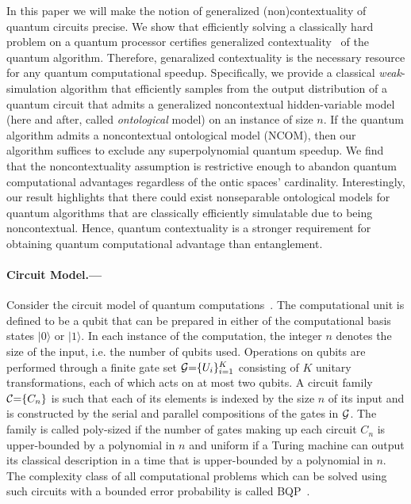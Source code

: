\documentclass[prl,twocolumn,amsmath,amssymb,nofootinbib]{revtex4-1}
\renewcommand{\ket}[1] {| #1 \rangle}
\newcommand{\CC}{{\cal C}}
\newcommand{\G}{{\cal G}}
\begin{document}
In this paper we will make the notion of generalized (non)contextuality of quantum circuits precise.
We show that efficiently solving a classically hard problem on a quantum processor certifies generalized contextuality~\cite{Spekkens2005} of the quantum algorithm.
Therefore, genaralized contextuality is the necessary resource for any quantum computational speedup.
Specifically, we provide a classical \textit{weak}-simulation algorithm that efficiently samples from the output distribution of a quantum circuit that admits a generalized noncontextual hidden-variable model (here and after, called \textit{ontological} model) on an instance of size $n$.
If the quantum algorithm admits a noncontextual ontological model (NCOM), then our algorithm suffices to exclude any superpolynomial quantum speedup.
We find that the noncontextuality assumption is restrictive enough to abandon quantum computational advantages regardless of the ontic spaces' cardinality.
Interestingly, our result highlights that there could exist nonseparable ontological models for quantum algorithms that are classically efficiently simulatable due to being noncontextual.
Hence, quantum contextuality is a stronger requirement for obtaining quantum computational advantage than entanglement.



\paragraph*{Circuit Model.---}
Consider the circuit model of quantum computations~\cite{Jozsa2003,NielsenBook}.
The computational unit is defined to be a qubit that can be prepared in either of the computational basis states $\ket{0}$ or $\ket{1}$.
In each instance of the computation, the integer $n$ denotes the size of the input, i.e. the number of qubits used.
Operations on qubits are performed through a finite gate set $\G{=}\{U_{i}\}_{i=1}^{K}$ consisting of $K$ unitary transformations, each of which acts on at most two qubits.
A circuit family $\CC{=}\{C_n\}$ is such that each of its elements is indexed by the size $n$ of its input and is constructed by the serial and parallel compositions of the gates in $\G$.
The family is called poly-sized if the number of gates making up each circuit $C_n$ is upper-bounded by a polynomial in $n$ and uniform if a Turing machine can output its classical description in a time that is upper-bounded by a polynomial in $n$.
The complexity class of all computational problems which can be solved using such circuits with a bounded error probability is called {\rm BQP}~\cite{NielsenBook}.  
\end{document}
